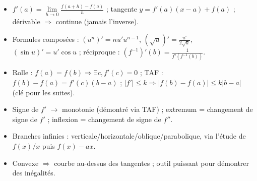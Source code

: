 \documentclass[11pt,a4paper]{article}
\begin{document}
\vspace{4mm}
\begin{tcolorbox}[
  enhanced, boxrule=0pt, arc=2mm,
  interior style={left color=qtealdark, right color=qteal},
  left=6mm, right=6mm, top=4mm, bottom=4mm,
  fontupper=\color{white}\sffamily,
  title={\sffamily\bfseries\color{white}\ding{72}~~À retenir},
  colbacktitle=qtealdark, coltitle=white, boxrule=0pt
]
\begin{itemize}[leftmargin=6mm, label={\color{qamber}}, itemsep=1mm]
  \item $f'(a) = \lim\limits_{h \to 0}\frac{f(a+h)-f(a)}{h}$ ; tangente $y = f'(a)(x-a)+f(a)$ ; dérivable $\Rightarrow$ continue (jamais l'inverse).
  \item Formules composées : $(u^n)' = nu'u^{n-1}$, $(\sqrt{u})' = \frac{u'}{2\sqrt{u}}$, $(\sin u)'=u'\cos u$ ; réciproque : $(f^{-1})'(b) = \frac{1}{f'(f^{-1}(b))}$.
  \item Rolle : $f(a)=f(b) \Rightarrow \exists c, f'(c)=0$ ; TAF : $f(b)-f(a)=f'(c)(b-a)$ ; $|f'|\leq k \Rightarrow |f(b)-f(a)|\leq k|b-a|$ (clé pour les suites).
  \item Signe de $f'$ $\to$ monotonie (démontré via TAF) ; extremum = changement de signe de $f'$ ; inflexion = changement de signe de $f''$.
  \item Branches infinies : verticale/horizontale/oblique/parabolique, via l'étude de $f(x)/x$ puis $f(x)-ax$.
  \item Convexe $\Rightarrow$ courbe au-dessus des tangentes ; outil puissant pour démontrer des inégalités.
\end{itemize}
\end{tcolorbox}
\end{document}
